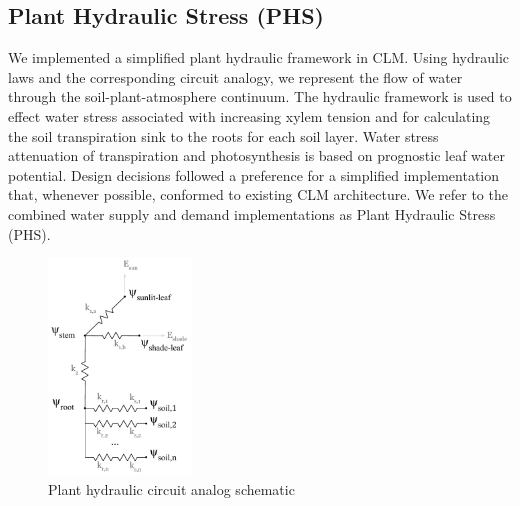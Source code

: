 \documentclass[draft,linenumbers]{agujournal}
\begin{document}
\subsection{Plant Hydraulic Stress (PHS)}
  We implemented a simplified plant hydraulic framework in CLM. 
  Using hydraulic laws and the corresponding circuit analogy, we represent the 
  flow of water through the soil-plant-atmosphere continuum. 
  The hydraulic framework is used to effect water stress associated with increasing xylem tension
  and for calculating the soil transpiration sink to the roots for each soil layer. 
  Water stress attenuation of transpiration and photosynthesis is based on prognostic leaf water potential. 
  Design decisions followed a preference for a simplified implementation that,
  whenever possible, conformed to existing CLM architecture.
  We refer to the combined water supply and demand implementations as Plant Hydraulic Stress (PHS).
  
  \begin{figure}[h]
     \centering
     \includegraphics[width=9pc]{../figs/circuit.pdf}
     \caption{Plant hydraulic circuit analog schematic}
     \label{circuit}
  \end{figure}
\end{document}

